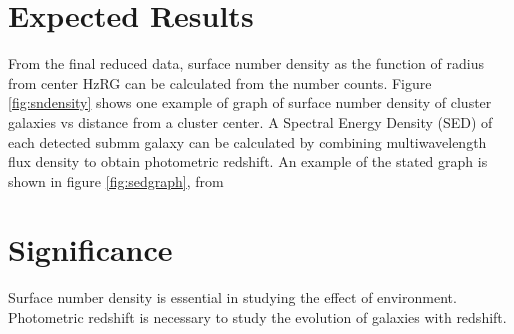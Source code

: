 \documentclass{article}
\begin{document}
\section{Expected Results}
From the final reduced data, surface number density as the function of radius from center HzRG can be calculated from the number counts. Figure \ref{fig:sndensity} shows one example of graph of surface number density of cluster galaxies vs distance from a cluster center. A Spectral Energy Density (SED) of each detected submm galaxy can be calculated by combining multiwavelength flux density to obtain photometric redshift. An example of the stated graph is shown in figure \ref{fig:sedgraph}, from \cite{Zotti2018}

\section{Significance}
Surface number density is essential in studying the effect of environment. Photometric redshift is necessary to study the evolution of galaxies with redshift.



\end{document}
